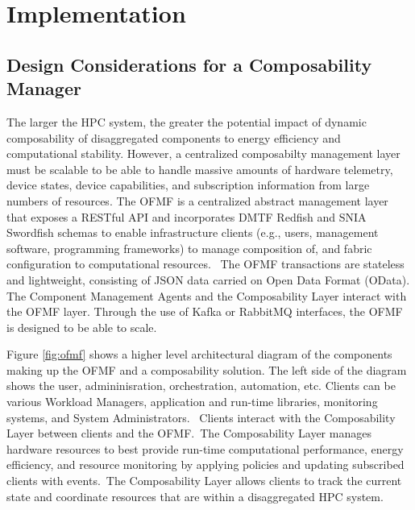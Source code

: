\section{Implementation}

\subsection{Design Considerations for a Composability Manager}

The larger the HPC system, the greater the potential impact of dynamic composability of disaggregated components to energy efficiency and computational stability.  However, a centralized composabilty management layer must be scalable to be able to handle massive amounts of hardware telemetry, device states, device capabilities, and subscription information from large numbers of resources.  The OFMF is a centralized abstract management layer that exposes a RESTful API \cite{restful} and incorporates DMTF Redfish \cite{redfish} and SNIA Swordfish \cite{swordfish} schemas to enable infrastructure clients (e.g., users, management software, programming frameworks) to manage composition of, and fabric configuration to computational resources.  The OFMF transactions are stateless and lightweight, consisting of JSON data carried on Open Data Format (OData).  The Component Management Agents and the Composability Layer interact with the OFMF layer.  Through the use of Kafka \cite{kafka} or RabbitMQ \cite{rabbitmq} interfaces, the OFMF is designed to be able to scale.

Figure \ref{fig:ofmf} shows a higher level architectural diagram of the components making up the OFMF and a composability solution.  The left side of the diagram shows the user, admininisration, orchestration, automation, etc. Clients can be various Workload Managers, application and run-time libraries, monitoring systems, and System Administrators.  Clients interact with the Composability Layer between clients and the OFMF. The Composability Layer manages hardware resources to best provide run-time computational performance, energy efficiency, and resource monitoring by applying policies and updating subscribed clients with events. The Composability Layer allows clients to track the current state and coordinate resources that are within a disaggregated HPC system.

